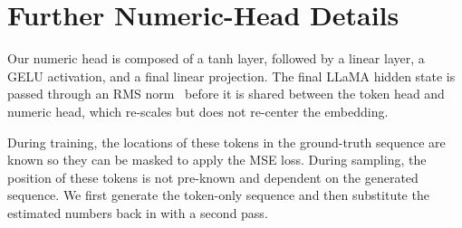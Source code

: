 \section{Further Numeric-Head Details}
Our numeric head is composed of a tanh layer, followed by a linear layer, a GELU activation, and a final linear projection.
The final LLaMA hidden state is passed through an RMS norm~\citep{rms_norm} before it is shared between the token head and numeric head, which re-scales but does not re-center the embedding.

During training, the locations of these tokens in the ground-truth sequence are known so they can be masked to apply the MSE loss.
During sampling, the position of these tokens is not pre-known and dependent on the generated sequence.
We first generate the token-only sequence and then substitute the estimated numbers back in with a second pass.
















